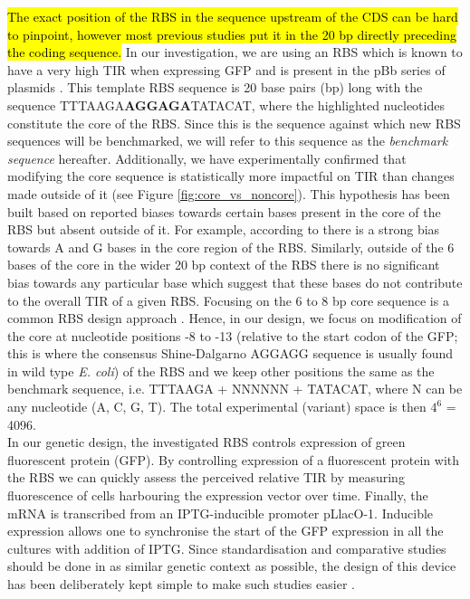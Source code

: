 \documentclass{article}
\begin{document}
\hl{The exact position of the RBS in the sequence upstream of the CDS can be hard to pinpoint, however most previous studies put it in the 20 bp directly preceding the coding sequence.} 
In our investigation, we are using an RBS which is known to have a very high TIR when expressing GFP and is present in the pBb series of plasmids \cite{Lee2011}.
This template RBS sequence is 20 base pairs (bp) long with the sequence TTTAAGA\textbf{AGGAGA}TATACAT, where the highlighted nucleotides constitute the core of the RBS.
Since this is the sequence against which new RBS sequences will be benchmarked,
we will refer to this sequence as the \textit{benchmark sequence} hereafter.
Additionally, we have experimentally confirmed that modifying the core sequence is statistically more impactful on TIR than changes made outside of it (see Figure \ref{fig:core_vs_noncore}).
This hypothesis has been built based on reported biases towards certain bases present in the core of the RBS but absent outside of it.
For example, according to \cite{SHULTZABERGER2001} there is a strong bias towards A and G bases in the core region of the RBS.
Similarly, outside of the 6 bases of the core in the wider 20 bp context of the RBS there is no significant bias towards any particular base which suggest that these bases do not contribute to the overall TIR of a given RBS. 
Focusing on the 6 to 8 bp core sequence is a common RBS design approach \cite{Jeschek2016}.
Hence, in our design, we focus on modification of the core at nucleotide positions -8 to -13 (relative to the start codon of the GFP; this is where the consensus Shine-Dalgarno AGGAGG sequence is usually found in wild type \textit{E. coli}) of the RBS and we keep other positions the same as the benchmark sequence, i.e. TTTAAGA + NNNNNN + TATACAT, where N can be any nucleotide (A, C, G, T). 
The total experimental (variant) space is then $4^6$ = 4096.\\

In our genetic design, the investigated RBS controls expression of green fluorescent protein (GFP).
By controlling expression of a fluorescent protein with the RBS we can quickly assess the perceived relative TIR by measuring fluorescence of cells harbouring the expression vector over time.
Finally, the mRNA is transcribed from an IPTG-inducible promoter pLlacO-1.
Inducible expression allows one to synchronise the start of the GFP expression in all the cultures with addition of IPTG.
Since standardisation and comparative studies should be done in as similar genetic context as possible, the design of this device has been deliberately kept simple to make such studies easier \cite{Beal2021}.\\
\end{document}
